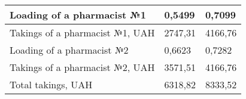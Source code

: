 \documentclass[11pt]{article}
\begin{document}
\begin{table}[h]
\begin{center}
\begin{tabularx}{450pt}{|X|X|X|}
                \hline
                Loading of a pharmacist №1 & 0,5499 & 0,7099\\
                \hline
                Takings of a pharmacist №1, UAH & 2747,31 & 4166,76\\
                \hline
                Loading of a pharmacist №2 & 0,6623 & 0,7282\\
                \hline
                Takings of a pharmacist №2, UAH & 3571,51 & 4166,76\\
                \hline
                Total takings, UAH & 6318,82 & 8333,52\\
                \hline
            \end{tabularx}
        \end{center}
    \end{table}
\end{document}
